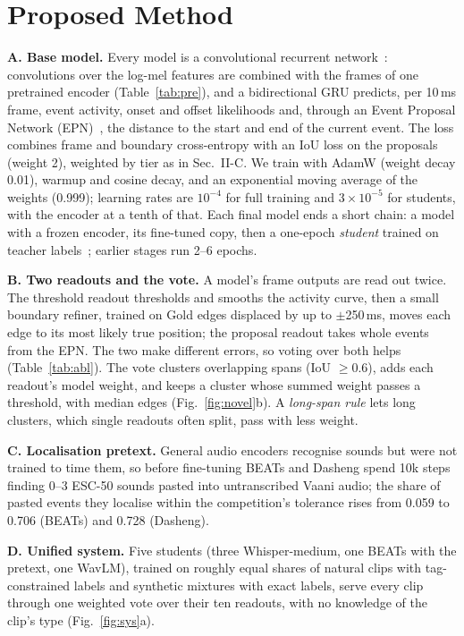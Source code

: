 \documentclass[conference]{IEEEtran}
\begin{document}
\section{Proposed Method}
\textbf{A. Base model.}
Every model is a convolutional recurrent network~\cite{crnn}: convolutions over the log-mel features are combined with the frames of one pretrained encoder (Table~\ref{tab:pre}), and a bidirectional GRU predicts, per 10\,ms frame, event activity, onset and offset likelihoods and, through an Event Proposal Network (EPN)~\cite{epn}, the distance to the start and end of the current event.
The loss combines frame and boundary cross-entropy with an IoU loss on the proposals (weight 2), weighted by tier as in Sec.~II-C. We train with AdamW (weight decay 0.01), warmup and cosine decay, and an exponential moving average of the weights (0.999); learning rates are $10^{-4}$ for full training and $3\times10^{-5}$ for students, with the encoder at a tenth of that.
Each final model ends a short chain: a model with a frozen encoder, its fine-tuned copy, then a one-epoch \emph{student} trained on teacher labels~\cite{noisystudent,cpjku}; earlier stages run 2--6 epochs.

\textbf{B. Two readouts and the vote.}
A model's frame outputs are read out twice.
The threshold readout thresholds and smooths the activity curve, then a small boundary refiner, trained on Gold edges displaced by up to $\pm$250\,ms, moves each edge to its most likely true position; the proposal readout takes whole events from the EPN.
The two make different errors, so voting over both helps (Table~\ref{tab:abl}).
The vote clusters overlapping spans (IoU $\geq$0.6), adds each readout's model weight, and keeps a cluster whose summed weight passes a threshold, with median edges (Fig.~\ref{fig:novel}b).
A \emph{long-span rule} lets long clusters, which single readouts often split, pass with less weight.

\textbf{C. Localisation pretext.}
General audio encoders recognise sounds but were not trained to time them, so before fine-tuning BEATs and Dasheng spend 10k steps finding 0--3 ESC-50 sounds pasted into untranscribed Vaani audio; the share of pasted events they localise within the competition's tolerance rises from 0.059 to 0.706 (BEATs) and 0.728 (Dasheng).

\textbf{D. Unified system.}
Five students (three Whisper-medium, one BEATs with the pretext, one WavLM), trained on roughly equal shares of natural clips with tag-constrained labels and synthetic mixtures with exact labels, serve every clip through one weighted vote over their ten readouts, with no knowledge of the clip's type (Fig.~\ref{fig:sys}a).
\end{document}
